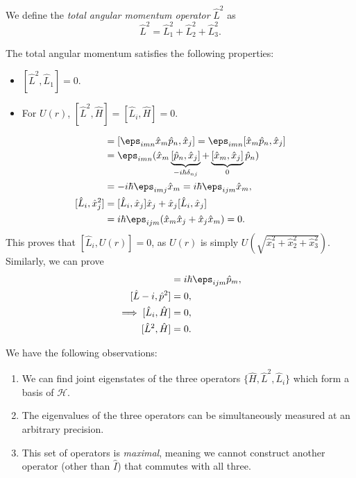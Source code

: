 \documentclass[12pt]{article}
\begin{document}
\begin{definition}
	We define the \textit{total angular momentum operator} $\hat L^2$ as
	\[
	\hat L^2 = \hat L_1^2 + \hat L_2^2 + \hat L_3^2
	.\]
\end{definition}

The total angular momentum satisfies the following properties:
\begin{itemize}
	\item $[\hat L^2, \hat L_1] = 0$.
	\item For $U(r)$, $[\hat L^2, \hat H] = [\hat L_i, \hat H] = 0$.
\end{itemize}

\begin{proofbox}
	\begin{align*}
		[\hat L_i, \hat x_j] &= [\eps_{imn}\hat x_m \hat p_n, \hat x_j] = \eps_{imn} [\hat x_m \hat p_n, \hat x_j] \\
				     &= \eps_{imn}(\hat x_m \underbrace{[\hat p_n, \hat x_j]}_{-i\hbar\delta_{nj}} + \underbrace{[\hat x_m, \hat x_j]}_{0} \hat p_n) \\
				     &= - i \hbar \eps_{imj} \hat x_m = i \hbar \eps_{ijm}\hat x_m, \\
		[\hat L_i, \hat x_j^2] &= [\hat L_i, \hat x_j] \hat x_j + \hat x_j [\hat L_i, \hat x_j] \\
				       &= i \hbar \eps_{ijm}(\hat x_m \hat x_j + \hat x_j \hat x_m) = 0.
	\end{align*}
	This proves that $[\hat L_i, U(r)] = 0$, as $U(r)$ is simply $U(\sqrt{\hat x_1^2 + \hat x_2^2 + \hat x_3^2})$. Similarly, we can prove
	\begin{align*}
		[\hat L_i, \hat p_j] &= i \hbar \eps_{ijm} \hat p_m, \\
		[\hat L-i, \hat p^2] &= 0, \\
		\implies [\hat L_i, \hat H] &= 0, \\
		[\hat L^2, \hat H] &= 0.
	\end{align*}
\end{proofbox}

We have the following observations:
\begin{enumerate}[1.]
	\item We can find joint eigenstates of the three operators $\{\hat H, \hat L^2, \hat L_i\}$ which form a basis of $\mathcal{H}$.
	\item The eigenvalues of the three operators can be simultaneously measured at an arbitrary precision.
	\item This set of operators is \textit{maximal}, meaning we cannot construct another operator (other than $\hat I$) that commutes with all three.
\end{enumerate}
\end{document}
